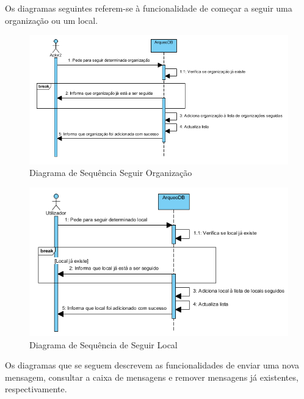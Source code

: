 ﻿\documentclass[12pt,a4paper]{article}
\begin{document}
\clearpage
Os diagramas seguintes referem-se à funcionalidade de começar a seguir uma organização ou um local.\\

\begin{figure}[h!]
\centering
\includegraphics[scale=0.8]{sequencia/seguirorganizacao}
\caption{Diagrama de Sequência Seguir Organização} 
\end{figure}

\begin{figure}[h!]
\centering
\includegraphics[scale=0.8]{sequencia/seguirlocal}
\caption{Diagrama de Sequência de Seguir Local} 
\end{figure}

\clearpage

Os diagramas que se seguem descrevem as funcionalidades de enviar uma nova mensagem, consultar a caixa de mensagens e remover mensagens já existentes, respectivamente.\\
\end{document}
